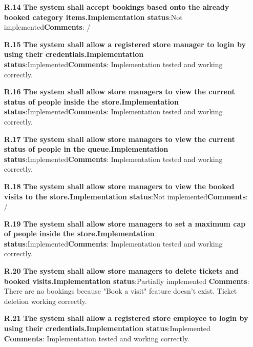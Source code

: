 \begin{itemize}
\item[\textbf{R.14}]\textbf{The system shall accept bookings based onto the already booked category items.}\newline \textbf{Implementation status}:Not implemented\newline \textbf{Comments}: /
\item[\textbf{R.15}]\textbf{The system shall allow a registered store manager to login by using their credentials.}\newline \textbf{Implementation status}:Implemented\newline \textbf{Comments}: Implementation tested and working correctly.
\item[\textbf{R.16}]\textbf{The system shall allow store managers to view the current status of people inside the store.}\newline \textbf{Implementation status}:Implemented\newline \textbf{Comments}: Implementation tested and working correctly.
\item[\textbf{R.17}]\textbf{The system shall allow store managers to view the current status of people in the queue.}\newline \textbf{Implementation status}:Implemented\newline \textbf{Comments}: Implementation tested and working correctly.
\item[\textbf{R.18}]\textbf{The system shall allow store managers to view the booked visits to the store.}\newline \textbf{Implementation status}:Not implemented\newline \textbf{Comments}: /
\item[\textbf{R.19}]\textbf{The system shall allow store managers to set a maximum cap of people inside the store.}\newline \textbf{Implementation status}:Implemented\newline \textbf{Comments}: Implementation tested and working correctly.
\item[\textbf{R.20}]\textbf{The system shall allow store managers to delete tickets and booked visits.}\newline \textbf{Implementation status}:Partially implemented \newline \textbf{Comments}: There are no bookings because "Book a visit" feature doesn't exist. Ticket deletion working correctly.
\item[\textbf{R.21}]\textbf{The system shall allow a registered store employee to login by using their credentials.}\newline \textbf{Implementation status}:Implemented \newline \textbf{Comments}: Implementation tested and working correctly.

\end{itemize}
